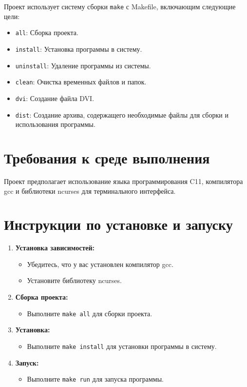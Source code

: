 \documentclass{article}
\begin{document}
Проект использует систему сборки \texttt{make} с Makefile, включающим следующие цели:

\begin{itemize}
    \item \texttt{all}: Сборка проекта.
    \item \texttt{install}: Установка программы в систему.
    \item \texttt{uninstall}: Удаление программы из системы.
    \item \texttt{clean}: Очистка временных файлов и папок.
    \item \texttt{dvi}: Создание файла DVI.
    \item \texttt{dist}: Создание архива, содержащего необходимые файлы для сборки и использования программы.
\end{itemize}

\section{Требования к среде выполнения}

Проект предполагает использование языка программирования C11, компилятора gcc и библиотеки ncurses для терминального интерфейса.

\section{Инструкции по установке и запуску}

\begin{enumerate}
    \item \textbf{Установка зависимостей:}
        \begin{itemize}
            \item Убедитесь, что у вас установлен компилятор gcc.
            \item Установите библиотеку ncurses.
        \end{itemize}
    \item \textbf{Сборка проекта:}
        \begin{itemize}
            \item Выполните \texttt{make all} для сборки проекта.
        \end{itemize}
    \item \textbf{Установка:}
        \begin{itemize}
            \item Выполните \texttt{make install} для установки программы в систему.
        \end{itemize}
    \item \textbf{Запуск:}
        \begin{itemize}
            \item Выполните \texttt{make run} для запуска программы.
        \end{itemize}
\end{enumerate}
\end{document}
